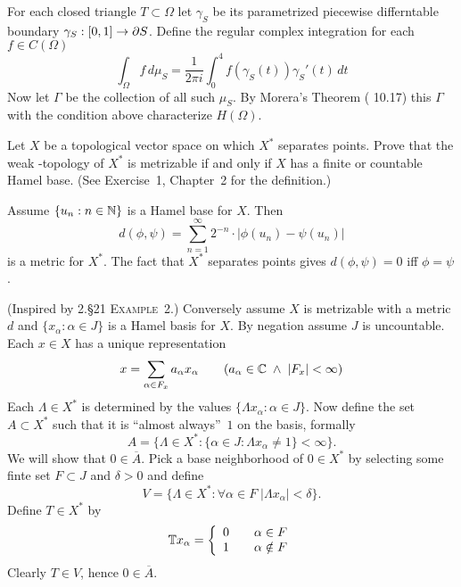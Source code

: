 \begin{enumerate}
\begin{itemize}
For each closed triangle \(T\subset \Omega\) let \(\gamma_S\)
be its parametrized piecewise differntable boundary
\(\gamma_S : [0,1] \to \partial S\).
Define the regular complex integration for each \(f\in C(\Omega)\)
\begin{equation*}
\int_\Omega  f\,d\mu_S = \frac{1}{2\pi i}\int_0^4 f(\gamma_S(t))\gamma_S'(t)\,dt
\end{equation*}
Now let \(\Gamma\) be the collection of all such \(\mu_S\).
By Morera's Theorem  (\cite{RudinRCA87} 10.17)
this \(\Gamma\) with the condition above characterize \(H(\Omega)\).
\end{itemize}

\begin{excopy}
Let $X$ be a topological vector space on which \(X^*\) separates points.
Prove that the weak \upstar-topology of \(X^*\) is metrizable if and only if
$X$ has a finite or countable Hamel base.
(See Exercise~1, Chapter~2 for the definition.)
\end{excopy}

Assume \(\{u_n: n\in\mathbb{N}\}\) is a Hamel base for $X$. Then
\begin{equation*}
d(\phi,\psi) = \sum_{n=1}^\infty 2^{-n}\cdot |\phi(u_n) - \psi(u_n)|
\end{equation*}
is a metric for \(X^*\). The fact that \(X^*\) separates points
gives \(d(\phi,\psi)=0\) iff \(\phi = \psi\).

(Inspired by \cite{Munkres2000} 2.\S{}21 \textsc{Example}~2.)\newline
Conversely assume $X$ is metrizable with a metric $d$
and \(\{x_\alpha: \alpha \in J\}\)
is a Hamel basis for $X$. By negation assume $J$ is uncountable.
Each \(x\in X\) has a unique representation
\begin{equation*}
x = \sum_{\alpha \in F_x} a_\alpha x_\alpha \qquad
   (a_\alpha \in \mathbb{C} \;\wedge\; |F_x| < \infty)
\end{equation*}
Each \(\Lambda \in X^*\) is determined by the values
 \(\{\Lambda x_\alpha: \alpha \in J\}\).
Now define the set \(A \subset X^*\) such that 
it is ``almost always''~$1$ on the basis, formally
\begin{equation*}
A = \bigl\{ \Lambda\in X^*: 
      \{\alpha \in J: \Lambda x_\alpha \neq 1\} < \infty 
    \bigr\}.
\end{equation*}
We will show that \(0 \in \overline{A}\).
Pick a base neighborhood of \(0\in X^*\) by selecting some finte 
set \(F \subset J\) and \(\delta>0\) and define
\begin{equation*}
V = \{\Lambda \in X^*: \forall \alpha\in F\; |\Lambda x_\alpha| < \delta\}.
\end{equation*}
Define \(T\in X^*\) by 
\begin{equation*}
\mathbb{T} x_\alpha = 
\left\{
 \begin{array}{ll}
 0 \quad& \alpha \in F \\
 1 \quad& \alpha \notin F
 \end{array}
\right.
\end{equation*}
Clearly \(T \in V\), hence \(0 \in \overline{A}\).


\end{enumerate}
